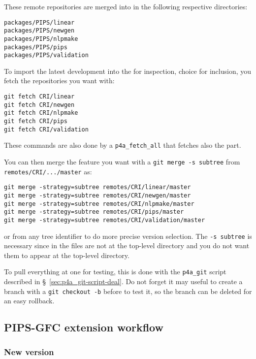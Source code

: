 \documentclass[a4paper]{article}
\begin{document}
These remote repositories are merged into \Apfa in the following
respective directories:
\begin{description}
\item[\texttt{packages/PIPS/linear}]
\item[\texttt{packages/PIPS/newgen}]
\item[\texttt{packages/PIPS/nlpmake}]
\item[\texttt{packages/PIPS/pips}]
\item[\texttt{packages/PIPS/validation}]
\end{description}

To import the latest \Apips development into the \Apfa{} \Agit for
inspection, choice for inclusion, you fetch the repositories you want
with:
\begin{verbatim}
git fetch CRI/linear
git fetch CRI/newgen
git fetch CRI/nlpmake
git fetch CRI/pips
git fetch CRI/validation
\end{verbatim}
These commands are also done by a \verb|p4a_fetch_all| that fetches also the
\Apolylib part.

You can then merge the feature you want with a \texttt{git merge -s
  subtree} from \texttt{remotes/CRI/.../master} as:
\begin{verbatim}
git merge -strategy=subtree remotes/CRI/linear/master
git merge -strategy=subtree remotes/CRI/newgen/master
git merge -strategy=subtree remotes/CRI/nlpmake/master
git merge -strategy=subtree remotes/CRI/pips/master
git merge -strategy=subtree remotes/CRI/validation/master
\end{verbatim}
or from any tree identifier to do more precise version selection. The
\texttt{-s subtree} is necessary since in \Apfa the \Apips files are not
at the top-level directory and you do not want them to appear at the
top-level directory.

To pull everything at one for testing, this is done with the
\verb|p4a_git| script described in \S~\ref{sec:p4a_git-script-deal}. Do
not forget it may useful to create a branch with a \texttt{git checkout
  -b} before to test it, so the branch can be deleted for an easy
rollback.


\subsection{PIPS-GFC extension workflow}
\label{sec:pips-gfc-workflow}

\subsubsection{New version}
\label{sec:new-version}
\end{document}
